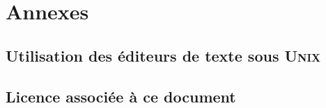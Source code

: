 \documentclass[titlepage,twoside,a4paper]{book}
\newcounter{remarque-cnt}
\newcounter{example-cnt}
\newcommand{\Unix}{\textsc{Unix}}
\newcommand{\myparttitle}{}
\newcommand{\mypart}[1]{
	{
		\pagestyle{empty}
		\part{#1}
	}
	\renewcommand{\myparttitle}{#1 -- }
}
\begin{document}





\mypart{Annexes}
\begin{appendix}




\setcounter{remarque-cnt}{1}
\setcounter{example-cnt}{1}
\chapter{Utilisation des {\'e}diteurs de texte sous {\Unix}}




\chapter{Licence associ{\'e}e {\`a} ce document}



\clearpage
\newpage
\renewcommand{\myparttitle}{\bibname -- }

\end{appendix}

\clearpage
\newpage
\printindex
\renewcommand{\myparttitle}{}


%
%
\end{document}
